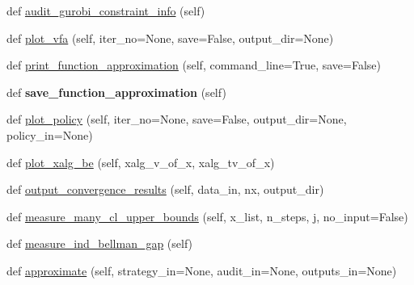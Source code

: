 \begin{DoxyCompactItemize}
def \mbox{\hyperlink{classgddp_1_1vfa_1_1_v_f_approximator_ad87136687e35dfb1127c56a10f1656c8}{audit\+\_\+gurobi\+\_\+constraint\+\_\+info}} (self)
\item 
def \mbox{\hyperlink{classgddp_1_1vfa_1_1_v_f_approximator_a29c731e88e000f0c991b7622f37a087d}{plot\+\_\+vfa}} (self, iter\+\_\+no=None, save=False, output\+\_\+dir=None)
\item 
def \mbox{\hyperlink{classgddp_1_1vfa_1_1_v_f_approximator_a6e8aef44abde4c6a1d2bce5474296143}{print\+\_\+function\+\_\+approximation}} (self, command\+\_\+line=True, save=False)
\item 
\mbox{\label{classgddp_1_1vfa_1_1_v_f_approximator_a0014d4fd4089c0bcb530980069c921f6}} 
def {\bfseries save\+\_\+function\+\_\+approximation} (self)
\item 
def \mbox{\hyperlink{classgddp_1_1vfa_1_1_v_f_approximator_a6dc19f7ef850e3568f3614abf1c6680c}{plot\+\_\+policy}} (self, iter\+\_\+no=None, save=False, output\+\_\+dir=None, policy\+\_\+in=None)
\item 
def \mbox{\hyperlink{classgddp_1_1vfa_1_1_v_f_approximator_a47860c0b82526ed12ecca7f058aaaa03}{plot\+\_\+xalg\+\_\+be}} (self, xalg\+\_\+v\+\_\+of\+\_\+x, xalg\+\_\+tv\+\_\+of\+\_\+x)
\item 
def \mbox{\hyperlink{classgddp_1_1vfa_1_1_v_f_approximator_a088e2efabc1d0b07a228a5cb1ce2dfe9}{output\+\_\+convergence\+\_\+results}} (self, data\+\_\+in, nx, output\+\_\+dir)
\item 
def \mbox{\hyperlink{classgddp_1_1vfa_1_1_v_f_approximator_aa89311e9d746f68aa2a788111434825c}{measure\+\_\+many\+\_\+cl\+\_\+upper\+\_\+bounds}} (self, x\+\_\+list, n\+\_\+steps, j, no\+\_\+input=False)
\item 
def \mbox{\hyperlink{classgddp_1_1vfa_1_1_v_f_approximator_a94eff4146cf2136eee4ee81fcf44bdd3}{measure\+\_\+ind\+\_\+bellman\+\_\+gap}} (self)
\item 
def \mbox{\hyperlink{classgddp_1_1vfa_1_1_v_f_approximator_a8eab71f7f7d2f248904874fc364fedc5}{approximate}} (self, strategy\+\_\+in=None, audit\+\_\+in=None, outputs\+\_\+in=None)
\end{DoxyCompactItemize}

